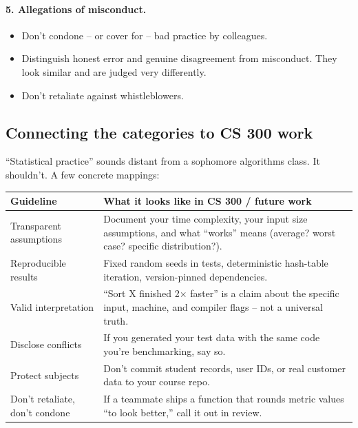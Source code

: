 \documentclass[11pt]{article}
\begin{document}
\paragraph{5. Allegations of misconduct.}
\begin{itemize}[leftmargin=*,noitemsep]
    \item Don't condone -- or cover for -- bad practice by
          colleagues.
    \item Distinguish honest error and genuine disagreement from
          misconduct. They look similar and are judged very
          differently.
    \item Don't retaliate against whistleblowers.
\end{itemize}

\subsection{Connecting the categories to CS 300 work}

``Statistical practice'' sounds distant from a sophomore algorithms
class. It shouldn't. A few concrete mappings:

\begin{center}
\small
\begin{tabular}{p{5cm} p{7cm}}
\textbf{Guideline} & \textbf{What it looks like in CS 300 / future work} \\
\hline
Transparent assumptions & Document your time complexity, your input
size assumptions, and what ``works'' means (average? worst case?
specific distribution?). \\
Reproducible results & Fixed random seeds in tests, deterministic
hash-table iteration, version-pinned dependencies. \\
Valid interpretation & ``Sort X finished 2$\times$ faster'' is a
claim about the specific input, machine, and compiler flags --
not a universal truth. \\
Disclose conflicts & If you generated your test data with the same
code you're benchmarking, say so. \\
Protect subjects & Don't commit student records, user IDs, or real
customer data to your course repo. \\
Don't retaliate, don't condone & If a teammate ships a function
that rounds metric values ``to look better,'' call it out in
review. \\
\end{tabular}
\normalsize
\end{center}
\end{document}
